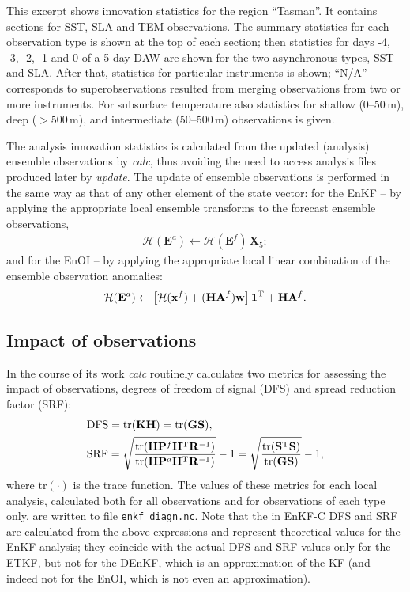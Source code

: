 \documentclass[11pt]{report}
\newcommand{\mb} {\mathbf}
\newcommand{\T}{^{\tiny \mathrm T}}
\begin{document}
This excerpt shows innovation statistics for the region ``Tasman''.
It contains sections for SST, SLA and TEM observations.
The summary statistics for each observation type is shown at the top of each section; then statistics for days -4, -3, -2, -1 and 0 of a 5-day DAW are shown for the two asynchronous types, SST and SLA.
After that, statistics for particular instruments is shown; ``N/A'' corresponds to superobservations resulted from merging observations from two or more instruments.
For subsurface temperature also statistics for shallow (0--50\,m), deep ($>$500\,m), and intermediate (50--500\,m) observations is given.

The analysis innovation statistics is calculated from the updated (analysis) ensemble observations by \emph{calc}, thus avoiding the need to access analysis files produced later by \emph{update}.
The update of ensemble observations is performed in the same way as that of any other element of the state vector:
for the EnKF -- by applying the appropriate local ensemble transforms to the forecast ensemble observations,
\begin{align*}
  \mathcal H (\mb E^a) \leftarrow \mathcal H (\mb E^f) \, \mb X_5;
\end{align*}
and for the EnOI -- by applying the appropriate local linear combination of the ensemble observation anomalies:
\begin{align*}
  \mathcal H (\mb E^a) \leftarrow \left[ \mathcal H (\mb x^f) + (\mb H \mb A^f) \mb w\right] \mb 1\T + \mb H \mb A^f.
\end{align*}

\subsection{Impact of observations}
\label{sec:impact}

In the course of its work \emph{calc} routinely calculates two metrics for assessing the impact of observations, degrees of freedom of signal (DFS) and spread reduction factor (SRF):
\begin{align*}
  & \mathrm{DFS} = \mathrm{tr}(\mb K \mb H) = \mathrm{tr}(\mb G \mb S), \\
  & \mathrm{SRF} = \sqrt{\frac{\mathrm{tr}(\mb H \mb P^f \mb H\T \mb R^{-1})}{\mathrm{tr}(\mb H \mb P^a \mb H\T \mb R^{-1})}} - 1 = \sqrt{\frac{\mathrm{tr}(\mb S\T \mb S)}{\mathrm{tr}(\mb G \mb S)}} - 1,
\end{align*}
where $\mathrm{tr}(\cdot)$ is the trace function.
The values of these metrics for each local analysis, calculated both for all observations and for observations of each type only, are written to file \verb|enkf_diagn.nc|.
Note that the in EnKF-C DFS and SRF are calculated from the above expressions and represent theoretical values for the EnKF analysis; they coincide with the actual DFS and SRF values only for the ETKF, but not for the DEnKF, which is an approximation of the KF (and indeed not for the EnOI, which is not even an approximation).
\end{document}
